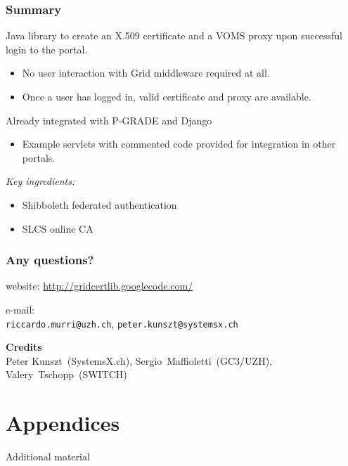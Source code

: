 \documentclass{beamer}
\newcommand{\+}{\vspace{1em}}
\begin{document}
\begin{frame}[label=summary]
  \frametitle{Summary}
  
  Java library to create an X.509 certificate and a VOMS proxy upon
  successful login to the portal.
  \begin{itemize}
  \item No user interaction with Grid middleware required at all.
  \item Once a user has logged in, valid certificate and proxy are
    available.
  \end{itemize}

  \+
  Already integrated with P-GRADE and Django
  \begin{itemize}
  \item Example servlets with commented code provided for integration
    in other portals.
  \end{itemize}

  \+
  \emph{Key ingredients:}
  \begin{itemize}
  \item Shibboleth federated authentication
  \item SLCS online CA
  \end{itemize}
\end{frame}


\begin{frame}
  \frametitle{Any questions?}
  \begin{center}\Large
    website: \url{http://gridcertlib.googlecode.com/}

    \+
    {e-mail: \\ \texttt{riccardo.murri@uzh.ch}, \texttt{peter.kunszt@systemsx.ch}}

    \+
    \textbf{Credits} \\
    Peter Kunszt~(SystemsX.ch),
    Sergio~Maffioletti~(GC3/UZH),
    Valery~Tschopp~(SWITCH)
  \end{center}
\end{frame}




\section{Appendices}
\begin{frame}
  \begin{center}
    {\Huge Additional material}
  \end{center}
\end{frame}
\end{document}
